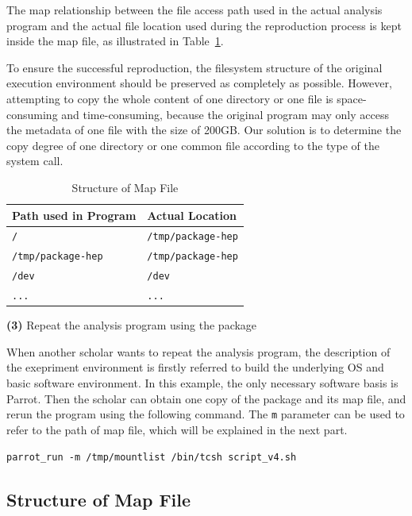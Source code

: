 \documentclass{sig-alternate}
\begin{document}
The map relationship between the file access path used in the actual analysis
program and the actual file location used during the reproduction process is
kept inside the map file, as illustrated in Table~\ref{table:map-file}.

To ensure the successful reproduction, the filesystem structure of the original
execution environment should be preserved as completely as possible. However,
attempting to copy the whole content of one directory or one file is
space-consuming and time-consuming, because the original program may only
access the metadata of one file with the size of 200GB. Our solution is to
determine the copy degree of one directory or one common file according to the
type of the system call.


\begin{table}
    \centering
    \begin{tabular}{|l|l|}
    \hline
    \bf Path used in Program & \bf Actual Location \\ \hline
    {\tt /} & {\tt /tmp/package-hep} \\ \hline
    {\tt /tmp/package-hep} & {\tt /tmp/package-hep} \\ \hline
    {\tt /dev} & {\tt /dev} \\ \hline
    {\tt ...} & {\tt ...}\\ \hline
    \end{tabular}
    \caption{Structure of Map File}
    \label{table:map-file}
\end{table}

{\bf (3)} Repeat the analysis program using the package

When another scholar wants to repeat the analysis program, 
the description of the exepriment environment is firstly referred to build the underlying OS and basic software environment. In this example, the only necessary software basis is Parrot. Then the scholar can obtain one copy of the package and its map file, and rerun the program using the following command. The {\tt m} parameter can be used to refer to the path of map file, which will be explained in the next part.

{\tt parrot\_run -m /tmp/mountlist /bin/tcsh script\_v4.sh}

\subsection{Structure of Map File} 
\end{document}
